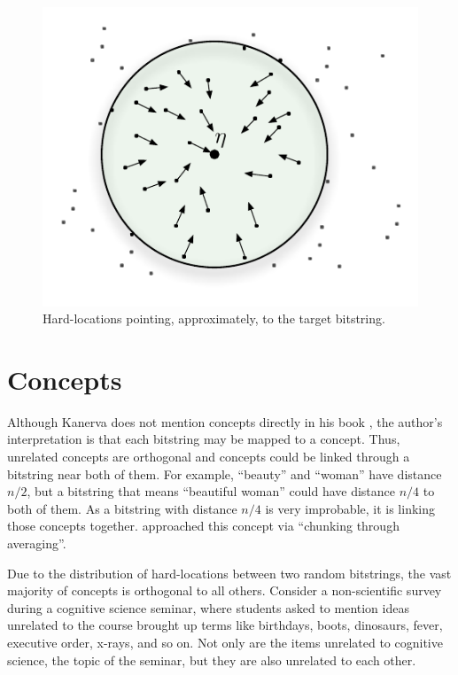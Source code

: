 \begin{figure}[!htb]
\centering\includegraphics[scale=0.75]{./images02/p1_after_write.pdf}

\caption{Hard-locations pointing, approximately, to the target bitstring.\label{fig-p1-pointers}}
\end{figure}



\section{Concepts}

Although Kanerva does not mention concepts directly in his book \citep{Kanerva1988}, the author's interpretation is that each bitstring may be mapped to a concept. Thus, unrelated concepts are orthogonal and concepts could be linked through a bitstring near both of them. For example, ``beauty'' and ``woman'' have distance $n/2$, but a bitstring that means ``beautiful woman'' could have distance $n/4$ to both of them. As a bitstring with distance $n/4$ is very improbable, it is linking those concepts together. \citet{Linhares2011} approached this concept via ``chunking through averaging''.

Due to the distribution of hard-locations between two random bitstrings, the vast majority of concepts is orthogonal to all others. Consider a non-scientific survey during a cognitive science seminar, where students asked to mention ideas unrelated to the course brought up terms like birthdays, boots, dinosaurs, fever, executive order, x-rays, and so on. Not only are the items unrelated to cognitive science, the topic of the seminar, but they are also unrelated to each other.

